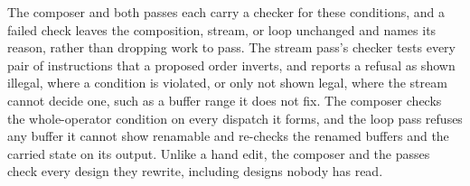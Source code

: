 \label{subsec:checkers}
The composer and both passes each carry a checker for these conditions, and a failed check leaves the composition, stream, or loop unchanged and names its reason, rather than dropping work to pass.
The stream pass's checker tests every pair of instructions that a proposed order inverts, and reports a refusal as shown illegal, where a condition is violated, or only not shown legal, where the stream cannot decide one, such as a buffer range it does not fix.
The composer checks the whole-operator condition on every dispatch it forms, and the loop pass refuses any buffer it cannot show renamable and re-checks the renamed buffers and the carried state on its output.
Unlike a hand edit, the composer and the passes check every design they rewrite, including designs nobody has read.

